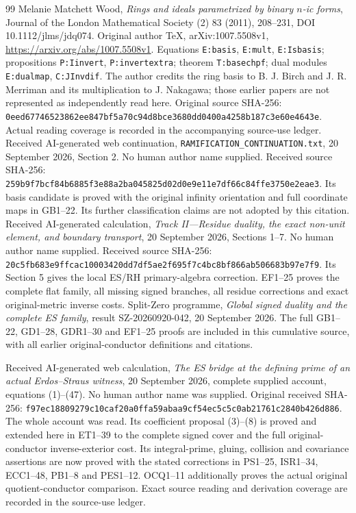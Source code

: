\documentclass[11pt]{article}
\begin{document}
\begin{thebibliography}{99}
 Melanie Matchett Wood,
\emph{Rings and ideals parametrized by binary $n$-ic forms},
Journal of the London Mathematical Society (2) 83 (2011), 208--231,
DOI 10.1112/jlms/jdq074. Original author TeX, arXiv:1007.5508v1,
\url{https://arxiv.org/abs/1007.5508v1}.
Equations \texttt{E:basis}, \texttt{E:mult}, \texttt{E:Isbasis};
propositions \texttt{P:Iinvert}, \texttt{P:invertextra};
theorem \texttt{T:basechpf}; dual modules \texttt{E:dualmap},
\texttt{C:JInvdif}. The author credits the ring basis to B. J. Birch
and J. R. Merriman and its multiplication to J. Nakagawa; those
earlier papers are not represented as independently read here.
Original source SHA-256:
\texttt{0eed67746523862ee847bf5a70c94d8bce3680dd0400a4258b187c3e60e4643e}.
Actual reading coverage is recorded in the accompanying source-use ledger.
 Received AI-generated web continuation,
\texttt{RAMIFICATION\_CONTINUATION.txt}, 20 September 2026,
Section 2. No human author name supplied. Received source SHA-256:
\texttt{259b9f7bcf84b6885f3e88a2ba045825d02d0e9e11e7df66c84ffe3750e2eae3}.
Its basis candidate is proved with the original infinity orientation
and full coordinate maps in GB1--22. Its further classification claims
are not adopted by this citation.
 Received AI-generated calculation,
\emph{Track II---Residue duality, the exact non-unit element,
and boundary transport}, 20 September 2026, Sections 1--7.
No human author name supplied. Received source SHA-256:
\texttt{20c5fb683e9ffcac10003420dd7df5ae2f695f7c4bc8bf866ab506683b97e7f9}.
Its Section 5 gives the local ES/RH primary-algebra correction.
EF1--25 proves the complete flat family, all missing signed branches,
all residue corrections and exact original-metric inverse costs.
 Split-Zero programme,
\emph{Global signed duality and the complete ES family},
result SZ-20260920-042, 20 September 2026. The full GB1--22,
GD1--28, GDR1--30 and EF1--25 proofs are included in this cumulative
source, with all earlier original-conductor definitions and citations.

 Received AI-generated web calculation,
\emph{The ES bridge at the defining prime of an actual Erdos--Straus witness},
20 September 2026, complete supplied account, equations (1)--(47).
No human author name was supplied.
Original received SHA-256: \texttt{f97ec18809279c10caf20a0ffa59abaa9cf54ec5c5c0ab21761c2840b426d886}.
The whole account was read. Its coefficient proposal (3)--(8) is
proved and extended here in ET1--39 to the complete signed cover and
the full original-conductor inverse-exterior cost.
Its integral-prime, gluing, collision and covariance assertions are now
proved with the stated corrections in PS1--25, ISR1--34, ECC1--48,
PB1--8 and PES1--12. OCQ1--11 additionally proves the actual original
quotient-conductor comparison. Exact source reading and derivation
coverage are recorded in the source-use ledger.



\end{thebibliography}
\end{document}
